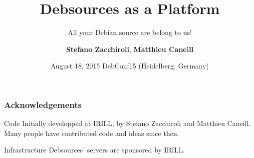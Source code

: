 \documentclass{beamer}
\title{Debsources as a Platform}
\subtitle{All your Debian source are belong to us!}
\author{\textbf{Stefano Zacchiroli}, \textbf{Matthieu Caneill}}
\date[DebConf15, 18 August 2015]{August 18, 2015\newline
  \alert{DebConf15} (Heidelberg, Germany)}
\begin{document}
\newcommand{\background}{
}

\background

\begin{frame}[plain]
  \titlepage  
\end{frame}

\usebackgroundtemplate{}

\begin{frame}
  \frametitle{Acknowledgements}
  
  \begin{block}{Code}
    Initially developped at IRILL, by Stefano Zacchiroli and Matthieu
    Caneill. Many people have contributed code and ideas since then.
  \end{block}

  \begin{block}{Infrastructure}
    Debsources' servers are sponsored by IRILL.
  \end{block}

\end{frame}
\end{document}
